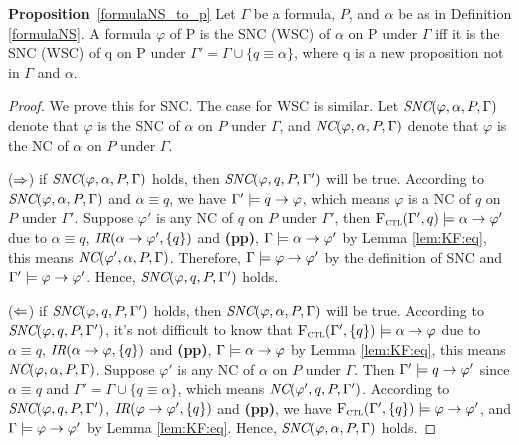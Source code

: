 \documentclass{article}
\begin{document}
\textbf{Proposition}~\ref{formulaNS_to_p}  Let $\Gamma$ be a formula, $P$, and $\alpha$ be as in Definition \ref{formulaNS}. A formula $\varphi$ of P is the SNC (WSC) of $\alpha$ on P under  $\Gamma$ iff it is the SNC (WSC) of q on P under $\Gamma' = \Gamma \cup \{q \equiv \alpha\}$, where q is a new proposition not in $\Gamma$ and $\alpha$.\\
\begin{proof}
    We prove this for SNC. The case for WSC is similar.
    Let $\emph{SNC}(\varphi,\alpha,P,\Gamma)$ denote that $\varphi$ is the SNC of $\alpha$ on $P$ under $\Gamma$, and  $\emph{NC}(\varphi,\alpha,P,\Gamma)$ denote that $\varphi$ is the NC of $\alpha$ on $P$ under $\Gamma$.

    ($\Rightarrow$) if $\emph{SNC}(\varphi,\alpha,P,\Gamma)$ holds, then $\emph{SNC}(\varphi,q,P,\Gamma')$ will be true. According to $\emph{SNC}(\varphi,\alpha,P,\Gamma)$ and $\alpha\equiv q$, we have $\Gamma' \models q\rightarrow \varphi$, which means $\varphi$ is a NC of $q$ on $P$ under $\Gamma'$. Suppose $\varphi'$ is any NC of $q$ on $P$ under $\Gamma'$, then ${\textsc{F}_{\textsc{ctl}}}(\Gamma',q)\models \alpha \rightarrow \varphi'$ due to $\alpha\equiv q$, $\emph{IR}(\alpha \rightarrow \varphi', \{q\})$ and {\bfseries (pp)}, \ie $\Gamma \models \alpha \rightarrow \varphi'$ by Lemma \ref{lem:KF:eq}, this means $\emph{NC}(\varphi',\alpha,P,\Gamma)$. Therefore, $\Gamma \models \varphi \rightarrow \varphi'$ by the definition of SNC and $\Gamma' \models \varphi \rightarrow \varphi'$. Hence, $\emph{SNC}(\varphi,q,P,\Gamma')$ holds.

    ($\Leftarrow$) if $\emph{SNC}(\varphi,q,P,\Gamma')$ holds, then $\emph{SNC}(\varphi,\alpha,P,\Gamma)$ will be true. According to $\emph{SNC}(\varphi,q,P,\Gamma')$, it's not difficult to know that ${\textsc{F}_{\textsc{ctl}}}(\Gamma', \{q\})\models \alpha \rightarrow \varphi$ due to $\alpha\equiv q$, $\emph{IR}(\alpha \rightarrow \varphi, \{q\})$ and {\bfseries (pp)}, \ie $\Gamma \models \alpha \rightarrow \varphi$ by Lemma \ref{lem:KF:eq}, this means $\emph{NC}(\varphi,\alpha,P,\Gamma)$. Suppose $\varphi'$ is any NC of $\alpha$ on $P$ under $\Gamma$. Then $\Gamma' \models q \rightarrow \varphi'$ since $\alpha\equiv q$ and $\Gamma'=\Gamma \cup \{q\equiv \alpha\}$, which means $\emph{NC}(\varphi',q,P,\Gamma')$. According to $\emph{SNC}(\varphi,q,P,\Gamma')$, $\emph{IR}(\varphi \rightarrow \varphi', \{q\})$ and {\bfseries (pp)}, we have
    ${\textsc{F}_{\textsc{ctl}}}(\Gamma', \{q\})\models \varphi \rightarrow \varphi'$, and $\Gamma \models \varphi \rightarrow \varphi'$ by Lemma \ref{lem:KF:eq}. Hence, $\emph{SNC}(\varphi,\alpha,P,\Gamma)$ holds.
    \end{proof}
\end{document}
